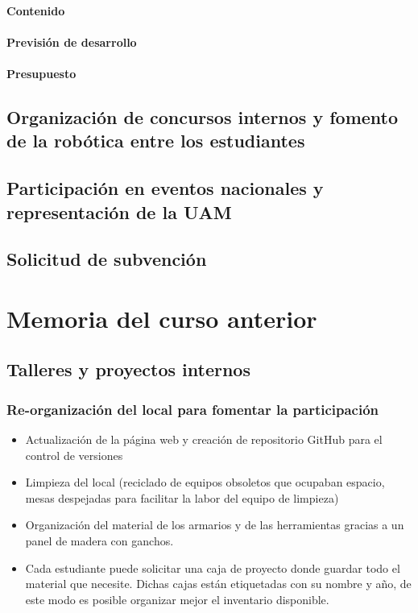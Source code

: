 \documentclass[12pt,twoside]{report}
\begin{document}
\subsubsection{Contenido}
\subsubsection{Previsión de desarrollo}
\subsubsection{Presupuesto}


\section{Organización de concursos internos y fomento de la robótica entre los estudiantes}


\section{Participación en eventos nacionales y representación de la UAM}

\section{Solicitud de subvención}








\chapter{Memoria del curso anterior}

\section{Talleres y proyectos internos}

\subsection{Re-organización del local para fomentar la participación}

\begin{itemize}
\item Actualización de la página web y creación de repositorio GitHub para el control de versiones
\item Limpieza del local (reciclado de equipos obsoletos que ocupaban espacio, mesas despejadas para facilitar la labor del equipo de limpieza)
\item Organización del material de los armarios y de las herramientas gracias a un panel de madera con ganchos.
\item Cada estudiante puede solicitar una caja de proyecto donde guardar todo el material que necesite. Dichas cajas están etiquetadas con su nombre y año, de este modo es posible organizar mejor el inventario disponible.
\end{itemize}
\end{document}
